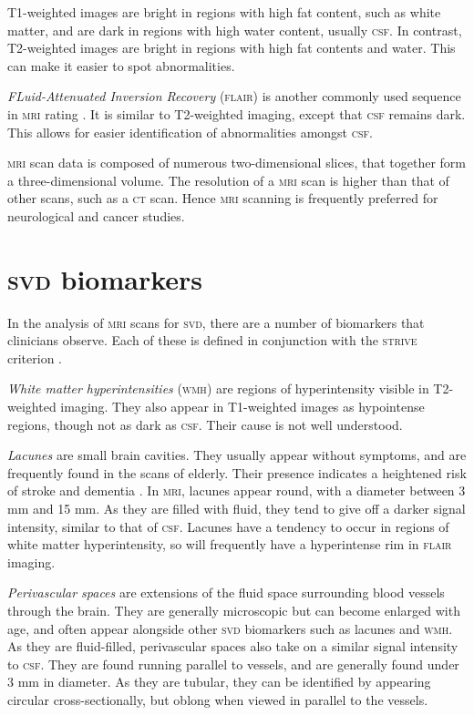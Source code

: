 T1-weighted images are bright in regions with high fat content, such as white matter, and are dark in regions with high water content, usually \textsc{csf}. In contrast, T2-weighted images are bright in regions with high fat contents and water. This can make it easier to spot abnormalities.

\textit{FLuid-Attenuated Inversion Recovery} (\textsc{flair}) is another commonly used sequence in \textsc{mri} rating \cite{WardlawJ.M.2013Nsfr}. It is similar to T2-weighted imaging, except that \textsc{csf} remains dark. This allows for easier identification of abnormalities amongst \textsc{csf}.


\textsc{mri} scan data is composed of numerous two-dimensional slices, that together form a three-dimensional volume. The resolution of a \textsc{mri} scan is higher than that of other scans, such as a \textsc{ct} scan. Hence \textsc{mri} scanning is frequently preferred for neurological and cancer studies.

\section{\textsc{svd} biomarkers}\label{svd-markers}

In the analysis of \textsc{mri} scans for \textsc{svd}, there are a number of biomarkers that clinicians observe. Each of these is defined in conjunction with the \textsc{strive} criterion \cite{WardlawJ.M.2013Nsfr}.

\textit{White matter hyperintensities} (\textsc{wmh}) are regions of hyperintensity visible in T2-weighted imaging. They also appear in T1-weighted images as hypointense regions, though not as dark as \textsc{csf}. Their cause is not well understood.

\textit{Lacunes} are small brain cavities. They usually appear without symptoms, and are frequently found in the scans of elderly. Their presence indicates a heightened risk of stroke and dementia \cite{BenjaminJ.Philip2018LIbN,VanDerFlierM.Wiesje2005SVDa}. In \textsc{mri}, lacunes appear round, with a diameter between 3 mm and 15 mm. As they are filled with fluid, they tend to give off a darker signal intensity, similar to that of \textsc{csf}. Lacunes have a tendency to occur in regions of white matter hyperintensity, so will frequently have a hyperintense rim in \textsc{flair} imaging.

\textit{Perivascular spaces} are extensions of the fluid space surrounding blood vessels through the brain. They are generally microscopic but can become enlarged with age, and often appear alongside other \textsc{svd} biomarkers such as lacunes and \textsc{wmh}. As they are fluid-filled, perivascular spaces also take on a similar signal intensity to \textsc{csf}. They are found running parallel to vessels, and are generally found under 3 mm in diameter. As they are tubular, they can be identified by appearing circular cross-sectionally, but oblong when viewed in parallel to the vessels.

